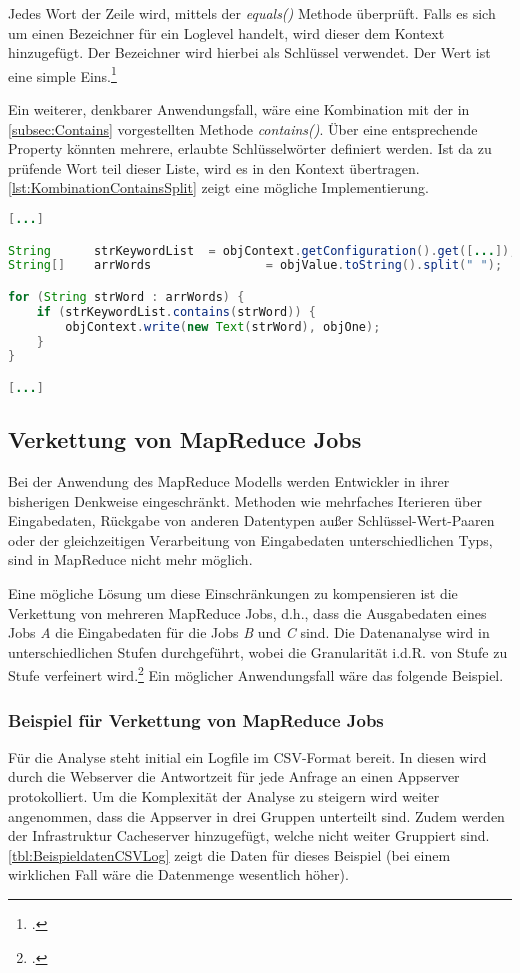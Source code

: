 Jedes Wort der Zeile wird, mittels der \textit{equals()} Methode überprüft. Falls es sich um einen Bezeichner für ein Loglevel handelt, wird dieser dem Kontext hinzugefügt. Der Bezeichner wird hierbei als Schlüssel verwendet. Der Wert ist eine simple Eins.\footcite[Vgl.][S. 121 f.]{Freiknecht.2014}

Ein weiterer, denkbarer Anwendungsfall, wäre eine Kombination mit der in \autoref{subsec:Contains} vorgestellten Methode \textit{contains()}. Über eine entsprechende Property könnten mehrere, erlaubte Schlüsselwörter definiert werden. Ist da zu prüfende Wort teil dieser Liste, wird es in den Kontext übertragen. \autoref{lst:KombinationContainsSplit} zeigt eine mögliche Implementierung. \\

\begin{lstlisting}[language=Java,caption=Kombination von \textit{contains()} und \textit{split()},label=lst:KombinationContainsSplit]
[...]

String		strKeywordList	= objContext.getConfiguration().get([...]);
String[]	arrWords 				= objValue.toString().split(" ");

for (String strWord : arrWords) {
	if (strKeywordList.contains(strWord)) {
		objContext.write(new Text(strWord), objOne);
	}
}

[...]
\end{lstlisting}

\subsection{Verkettung von MapReduce Jobs}
Bei der Anwendung des MapReduce Modells werden Entwickler in ihrer bisherigen Denkweise eingeschränkt. Methoden wie mehrfaches Iterieren über Eingabedaten, Rückgabe von anderen Datentypen außer Schlüssel-Wert-Paaren oder der gleichzeitigen Verarbeitung von Eingabedaten unterschiedlichen Typs, sind in MapReduce nicht mehr möglich.

Eine mögliche Lösung um diese Einschränkungen zu kompensieren ist die Verkettung von mehreren MapReduce Jobs, d.h., dass die Ausgabedaten eines Jobs \textit{A} die Eingabedaten für die Jobs \textit{B} und \textit{C} sind. Die Datenanalyse wird in unterschiedlichen Stufen durchgeführt, wobei die Granularität i.d.R. von Stufe zu Stufe verfeinert wird.\footcite[Vgl.][S. 94]{Freiknecht.2014} Ein möglicher Anwendungsfall wäre das folgende Beispiel.

\subsubsection{Beispiel für Verkettung von MapReduce Jobs}
Für die Analyse steht initial ein Logfile im CSV-Format bereit. In diesen wird durch die Webserver die Antwortzeit für jede Anfrage an einen Appserver protokolliert. Um die Komplexität der Analyse zu steigern wird weiter angenommen, dass die Appserver in drei Gruppen unterteilt sind. Zudem werden der Infrastruktur Cacheserver hinzugefügt, welche nicht weiter Gruppiert sind. \autoref{tbl:BeispieldatenCSVLog} zeigt die Daten für dieses Beispiel (bei einem wirklichen Fall wäre die Datenmenge wesentlich höher).

